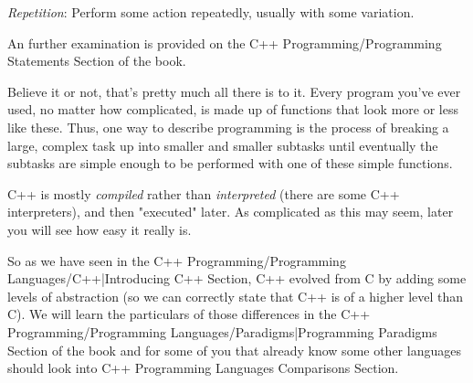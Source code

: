\textit{Repetition}: Perform some action repeatedly, usually with some variation.

An further examination is provided on the C++ Programming/Programming
Statements Section of the book. 

Believe it or not, that's pretty much all there is to it. Every program you've
ever used, no matter how complicated, is made up of functions that look more or
less like these. Thus, one way to describe programming is the process of
breaking a large, complex task up into smaller and smaller subtasks until
eventually the subtasks are simple enough to be performed with one of these
simple functions.

C++ is mostly \textit{compiled} rather than \textit{interpreted} (there are some
C++ interpreters), and then "executed" later. As complicated as this may seem,
later you will see how easy it really is.

So as we have seen in the C++ Programming/Programming Languages/C++|Introducing
C++ Section, C++ evolved from C by adding some levels of abstraction (so we can
correctly state that C++ is of a higher level than C). We will learn the
particulars of those differences in the C++ Programming/Programming
Languages/Paradigms|Programming Paradigms Section of the book and for some of
you that already know some other languages should look into C++
Programming Languages Comparisons Section. 
